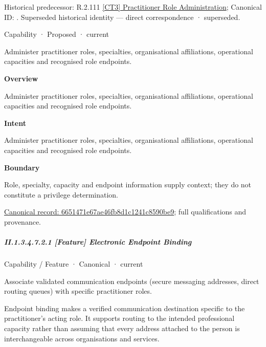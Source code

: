 {\small Historical predecessor: R.2.111 \hyperref[element:6b777f1201db474eb22dd89f2b1f68c6]{[CT3] Practitioner Role Administration}; Canonical ID: \texttt{}. Superseded historical identity — direct correspondence · superseded.}\par
\label{element:6651471e67ae46fb8d1c1241c8590be9}
{\small Capability · Proposed · current}\par

Administer practitioner roles, specialties, organisational affiliations, operational capacities and recognised role endpoints.



\textbf{Overview}



Administer practitioner roles, specialties, organisational affiliations, operational capacities and recognised role endpoints.



\textbf{Intent}



Administer practitioner roles, specialties, organisational affiliations, operational capacities and recognised role endpoints.



\textbf{Boundary}



Role, specialty, capacity and endpoint information supply context; they do not constitute a privilege determination.


{\footnotesize \href{../../../../../../../continuum/strategy/capability/6651471e67ae46fb8d1c1241c8590be9.md}{Canonical record: 6651471e67ae46fb8d1c1241c8590be9}; full qualifications and provenance.}\par
\subparagraph*{II.1.3.4.7.2.1 [Feature] Electronic Endpoint Binding}
\label{navigation:II.1.3.4.7.2.1}

\label{element:5dc3a424e68d47aea64ec573dc4b1225}
{\small Capability / Feature · Canonical · current}\par

Associate validated communication endpoints (secure messaging addresses, direct routing queues) with specific practitioner roles.



Endpoint binding makes a verified communication destination specific to the practitioner's acting role. It supports routing to the intended professional capacity rather than assuming that every address attached to the person is interchangeable across organisations and services.


